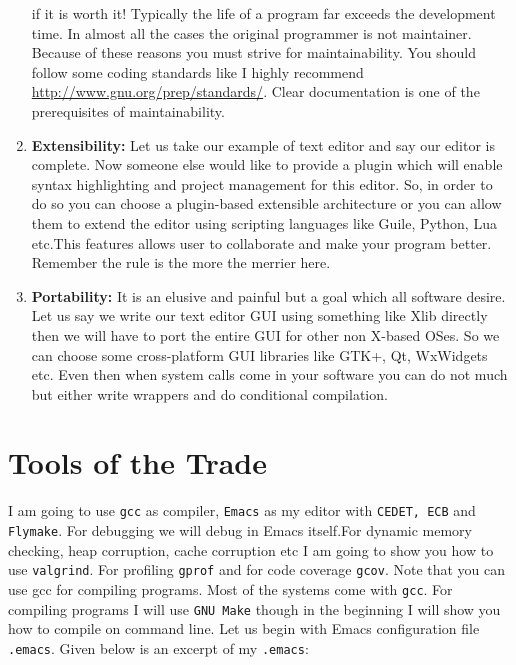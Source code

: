 \begin{enumerate}
  if it is worth it! Typically the life of a program far exceeds the
  development time. In almost all the cases the original programmer is not
  maintainer. Because of these reasons you must strive for maintainability. You
  should follow some coding standards like I highly recommend
  \url{http://www.gnu.org/prep/standards/}. Clear documentation is one of the
  prerequisites of maintainability.
\item \textbf{Extensibility:} Let us take our example of text editor and say
  our editor is complete. Now someone else would like to provide a plugin which
  will enable syntax highlighting and project management for this editor. So,
  in order to do so you can choose a plugin-based extensible architecture or
  you can allow them to extend the editor using scripting languages like Guile,
  Python, Lua etc.This features allows user to collaborate and make your
  program better. Remember the rule is the more the merrier here.
\item \textbf{Portability:} It is an elusive and painful but a goal which all
  software desire. Let us say we write our text editor GUI using something like
  Xlib directly then we will have to port the entire GUI for other non X-based
  OSes. So we can choose some cross-platform GUI libraries like GTK+, Qt,
  WxWidgets etc. Even then when system calls come in your software you can do
  not much but either write wrappers and do conditional compilation.
\end{enumerate}

\section{Tools of the Trade}
I am going to use \texttt{gcc} as compiler, \texttt{Emacs} as my editor with
\texttt{CEDET, ECB} and \texttt{Flymake}. For debugging we will debug in Emacs
itself.For dynamic memory checking, heap corruption, cache corruption etc I am
going to show you how to use \texttt{valgrind}. For profiling \texttt{gprof}
and for code coverage \texttt{gcov}. Note that you can 
use gcc for compiling programs. Most of the systems come with \texttt{gcc}. For
compiling programs I will use \texttt{GNU Make} though in the beginning I will
show you how to compile on command line. Let us begin with Emacs configuration
file \texttt{.emacs}. Given below is an excerpt of my \texttt{.emacs}:

